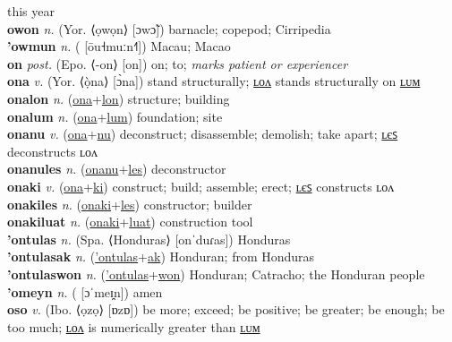 this year \label{olpumkwelwel} \\
\textbf{owon} \textit{n.} (Yor. ⟨ọwọn⟩ [ɔwɔ̃])
barnacle; copepod; Cirripedia \label{owon} \\
\textbf{'owmun} \textit{n.} ( [ōu˧muːn˧˥])
Macau; Macao \label{'owmun} \\
\textbf{on} \textit{post.} (Epo. ⟨-on⟩ [on])
on; to; \textit{marks patient or experiencer} \label{on} \\
\textbf{ona} \textit{v.} (Yor. ⟨ọ̀na⟩ [ɔ̀na])
stand structurally; \hyperref[onalon]{ʟᴏᴧ} stands structurally on \hyperref[onalum]{ʟᴜᴍ} \label{ona} \\
\textbf{onalon} \textit{n.} (\hyperref[ona]{ona}+\hyperref[lon]{lon})
structure; building \label{onalon} \\
\textbf{onalum} \textit{n.} (\hyperref[ona]{ona}+\hyperref[lum]{lum})
foundation; site \label{onalum} \\
\textbf{onanu} \textit{v.} (\hyperref[ona]{ona}+\hyperref[nu]{nu})
deconstruct; disassemble; demolish; take apart; \hyperref[onanules]{ʟєꜱ} deconstructs ʟᴏᴧ \label{onanu} \\
\textbf{onanules} \textit{n.} (\hyperref[onanu]{onanu}+\hyperref[les]{les})
deconstructor \label{onanules} \\
\textbf{onaki} \textit{v.} (\hyperref[ona]{ona}+\hyperref[ki]{ki})
construct; build; assemble; erect; \hyperref[onakiles]{ʟєꜱ} constructs ʟᴏᴧ \label{onaki} \\
\textbf{onakiles} \textit{n.} (\hyperref[onaki]{onaki}+\hyperref[les]{les})
constructor; builder \label{onakiles} \\
\textbf{onakiluat} \textit{n.} (\hyperref[onaki]{onaki}+\hyperref[luat]{luat})
construction tool \label{onakiluat} \\
\textbf{'ontulas} \textit{n.} (Spa. ⟨Honduras⟩ [onˈduɾas])
Honduras \label{'ontulas} \\
\textbf{'ontulasak} \textit{n.} (\hyperref['ontulas]{'ontulas}+\hyperref[ak]{ak})
Honduran; from Honduras \label{'ontulasak} \\
\textbf{'ontulaswon} \textit{n.} (\hyperref['ontulas]{'ontulas}+\hyperref[won]{won})
Honduran; Catracho; the Honduran people \label{'ontulaswon} \\
\textbf{'omeyn} \textit{n.} ( [ɔˈmeɪ̯n])
amen \label{'omeyn} \\
\textbf{oso} \textit{v.} (Ibo. ⟨ọzọ⟩ [ɒzɒ])
be more; exceed; be positive; be greater; be enough; be too much; \hyperref[osolon]{ʟᴏᴧ} is numerically greater than \hyperref[osolum]{ʟᴜᴍ} \label{oso} \\
